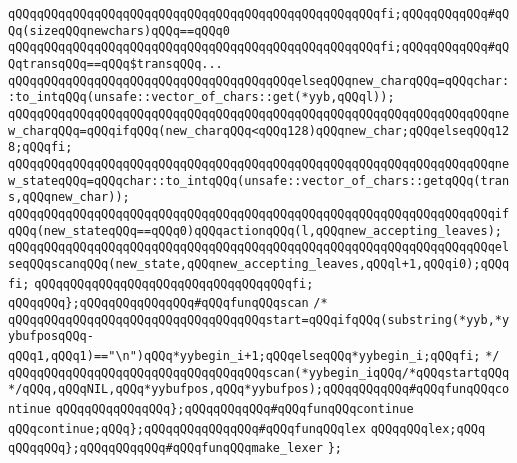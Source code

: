 \verb|qQQqqQQqqQQqqQQqqQQqqQQqqQQqqQQqqQQqqQQqqQQqqQQqqQQqfi;qQQqqQQqqQQq#qQQq(sizeqQQqnewchars)qQQq==qQQq0|\newline
\verb|qQQqqQQqqQQqqQQqqQQqqQQqqQQqqQQqqQQqqQQqqQQqqQQqqQQqfi;qQQqqQQqqQQq#qQQqtransqQQq==qQQq$transqQQq...|\newline
\verb|qQQqqQQqqQQqqQQqqQQqqQQqqQQqqQQqqQQqqQQqelseqQQqnew_charqQQq=qQQqchar::to_intqQQq(unsafe::vector_of_chars::get(*yyb,qQQql));|\newline
\verb|qQQqqQQqqQQqqQQqqQQqqQQqqQQqqQQqqQQqqQQqqQQqqQQqqQQqqQQqqQQqqQQqqQQqnew_charqQQq=qQQqifqQQq(new_charqQQq<qQQq128)qQQqnew_char;qQQqelseqQQq128;qQQqfi;|\newline
\verb|qQQqqQQqqQQqqQQqqQQqqQQqqQQqqQQqqQQqqQQqqQQqqQQqqQQqqQQqqQQqqQQqqQQqnew_stateqQQq=qQQqchar::to_intqQQq(unsafe::vector_of_chars::getqQQq(trans,qQQqnew_char));|\newline
\verb|qQQqqQQqqQQqqQQqqQQqqQQqqQQqqQQqqQQqqQQqqQQqqQQqqQQqqQQqqQQqqQQqqQQqifqQQq(new_stateqQQq==qQQq0)qQQqactionqQQq(l,qQQqnew_accepting_leaves);|\newline
\verb|qQQqqQQqqQQqqQQqqQQqqQQqqQQqqQQqqQQqqQQqqQQqqQQqqQQqqQQqqQQqqQQqqQQqelseqQQqscanqQQq(new_state,qQQqnew_accepting_leaves,qQQql+1,qQQqi0);qQQqfi;|\newline
\verb|qQQqqQQqqQQqqQQqqQQqqQQqqQQqqQQqqQQqfi;|\newline
\verb|qQQqqQQq};qQQqqQQqqQQqqQQq#qQQqfunqQQqscan|\newline
\verb|/*|\newline
\verb|qQQqqQQqqQQqqQQqqQQqqQQqqQQqqQQqqQQqstart=qQQqifqQQq(substring(*yyb,*yybufposqQQq-qQQq1,qQQq1)=="\n")qQQq*yybegin_i+1;qQQqelseqQQq*yybegin_i;qQQqfi;|\newline
\verb|*/|\newline
\verb|qQQqqQQqqQQqqQQqqQQqqQQqqQQqqQQqqQQqscan(*yybegin_iqQQq/*qQQqstartqQQq*/qQQq,qQQqNIL,qQQq*yybufpos,qQQq*yybufpos);qQQqqQQqqQQq#qQQqfunqQQqcontinue|\newline
\verb|qQQqqQQqqQQqqQQq};qQQqqQQqqQQq#qQQqfunqQQqcontinue|\newline
\verb|qQQqcontinue;qQQq};qQQqqQQqqQQqqQQq#qQQqfunqQQqlex|\newline
\verb|qQQqqQQqlex;qQQq|\newline
\verb|qQQqqQQq};qQQqqQQqqQQq#qQQqfunqQQqmake_lexer|\newline
\verb|};|\newline

